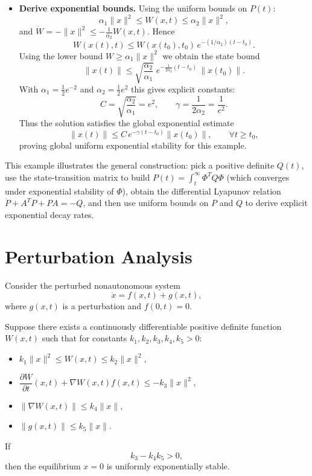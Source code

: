 \begin{example}
\begin{itemize}
    \item \textbf{Derive exponential bounds.} Using the uniform bounds on \(P(t)\):
    \[
    \alpha_1 \|x\|^2 \le W(x,t) \le \alpha_2 \|x\|^2,
    \]
    and \(\dot W = -\|x\|^2 \le -\tfrac{1}{\alpha_2} W(x,t)\). Hence
    \[
    W(x(t),t) \le W(x(t_0),t_0)\,e^{-(1/\alpha_2)(t-t_0)}.
    \]
    Using the lower bound \(W\ge \alpha_1 \|x\|^2\) we obtain the state bound
    \[
    \|x(t)\| \le \sqrt{\frac{\alpha_2}{\alpha_1}}\; e^{-\tfrac{1}{2\alpha_2}(t-t_0)} \,\|x(t_0)\|.
    \]
    With \(\alpha_1=\tfrac{1}{2}e^{-2}\) and \(\alpha_2=\tfrac{1}{2}e^{2}\) this gives explicit constants:
    \[
    C=\sqrt{\frac{\alpha_2}{\alpha_1}} = e^{2}, \qquad
    \gamma=\frac{1}{2\alpha_2} = \frac{1}{e^{2}}.
    \]
    Thus the solution satisfies the global exponential estimate
    \[
    \|x(t)\| \le C\, e^{-\gamma (t-t_0)} \|x(t_0)\|,\qquad \forall t\ge t_0,
    \]
    proving global uniform exponential stability for this example.
\end{itemize}

\begin{remark}
This example illustrates the general construction: pick a positive definite \(Q(t)\), use the state-transition matrix to build \(P(t)=\int_t^\infty \Phi^T Q \Phi\) (which converges under exponential stability of \(\Phi\)), obtain the differential Lyapunov relation
\(\dot P + A^T P + P A = -Q\), and then use uniform bounds on \(P\) and \(Q\) to derive explicit exponential decay rates.
\end{remark}
\end{example}

\section{Perturbation Analysis}

Consider the perturbed nonautonomous system
\[
\dot{x} = f(x,t) + g(x,t),
\]
where \(g(x,t)\) is a perturbation and \(f(0,t)=0\).

\begin{theorem}
Suppose there exists a continuously differentiable positive definite function \(W(x,t)\) such that for constants \(k_1,k_2,k_3,k_4,k_5>0\):\\
\begin{itemize}
    \item \(k_1 \|x\|^2 \le W(x,t) \le k_2 \|x\|^2\),
    \item \(\dfrac{\partial W}{\partial t}(x,t) + \nabla W(x,t) f(x,t) \le -k_3 \|x\|^2\),
    \item \(\|\nabla W(x,t)\| \le k_4 \|x\|\),
    \item \(\|g(x,t)\| \le k_5 \|x\|\).
\end{itemize}
If
\[
k_3 - k_4 k_5 > 0,
\]
then the equilibrium \(x=0\) is uniformly exponentially stable.
\end{theorem}

